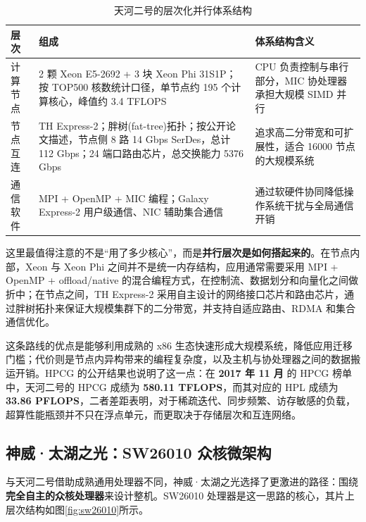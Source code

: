 \documentclass[a4paper]{article}
\begin{document}
\begin{table}[htbp]
  \centering
  \small
  \begin{tabular}{p{2.0cm}p{4.8cm}p{5.3cm}}
  \toprule
  层次 & 组成 & 体系结构含义 \\
  \midrule
  计算节点 & 2 颗 Xeon E5-2692 + 3 块 Xeon Phi 31S1P；按 TOP500 核数统计口径，单节点约 195 个计算核心，峰值约 3.4 TFLOPS & CPU 负责控制与串行部分，MIC 协处理器承担大规模 SIMD 并行 \\
  节点互连 & TH Express-2；胖树(fat-tree)拓扑；按公开论文描述，节点侧 8 路 14 Gbps SerDes，总计 112 Gbps；24 端口路由芯片，总交换能力 5376 Gbps & 追求高二分带宽和可扩展性，适合 16000 节点的大规模系统 \\
  通信软件 & MPI + OpenMP + MIC 编程；Galaxy Express-2 用户级通信、NIC 辅助集合通信 & 通过软硬件协同降低操作系统干扰与全局通信开销 \\
  \bottomrule
  \end{tabular}
  \caption{天河二号的层次化并行体系结构}
  \label{table:tianhe2_arch}
\end{table}

这里最值得注意的不是“用了多少核心”，而是\textbf{并行层次是如何搭起来的}。在节点内部，Xeon 与 Xeon Phi 之间并不是统一内存结构，应用通常需要采用 MPI + OpenMP + offload/native 的混合编程方式，在控制流、数据划分和向量化之间做折中；在节点之间，TH Express-2 采用自主设计的网络接口芯片和路由芯片，通过胖树拓扑来保证大规模集群下的二分带宽，并支持自适应路由、RDMA 和集合通信优化\cite{tianhe2_2013,th_express2_2016}。

这条路线的优点是能够利用成熟的 x86 生态快速形成大规模系统，降低应用迁移门槛；代价则是节点内异构带来的编程复杂度，以及主机与协处理器之间的数据搬运开销。HPCG 的公开结果也说明了这一点：在 \textbf{2017 年 11 月} 的 HPCG 榜单中，天河二号的 HPCG 成绩为 \textbf{580.11 TFLOPS}，而其对应的 HPL 成绩为 \textbf{33.86 PFLOPS}，二者差距表明，对于稀疏迭代、同步频繁、访存敏感的负载，超算性能瓶颈并不只在浮点单元，而更取决于存储层次和互连网络\cite{hpcg_2017_11}。

\subsection{神威·太湖之光：SW26010 众核微架构}
与天河二号借助成熟通用处理器不同，神威·太湖之光选择了更激进的路径：围绕\textbf{完全自主的众核处理器}来设计整机。SW26010 处理器是这一思路的核心，其片上层次结构如图\ref{fig:sw26010}所示。
\end{document}

